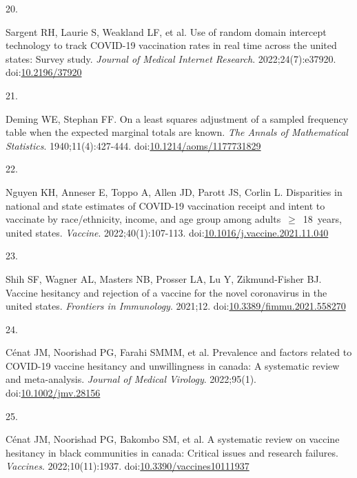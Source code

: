 \documentclass[
  letterpaper,
  DIV=11,
  numbers=noendperiod]{scrartcl}
\newlength{\cslhangindent}
\newlength{\csllabelwidth}
\newlength{\cslentryspacingunit} %
\newenvironment{CSLReferences}[2] %
 {%
  \setlength{\parindent}{0pt}
  \ifodd #1
  \let\oldpar\par
  \def\par{\hangindent=\cslhangindent\oldpar}
  \fi
  \setlength{\parskip}{#2\cslentryspacingunit}
 }%
 {}
\newcommand{\CSLLeftMargin}[1]{\parbox[t]{\csllabelwidth}{#1}}
\newcommand{\CSLRightInline}[1]{\parbox[t]{\linewidth - \csllabelwidth}{#1}\break}
\begin{document}
\begin{CSLReferences}{0}{0}
\leavevmode{}%
\CSLLeftMargin{20. }%
\CSLRightInline{Sargent RH, Laurie S, Weakland LF, et al. Use of random
domain intercept technology to track {COVID}-19 vaccination rates in
real time across the united states: Survey study. \emph{Journal of
Medical Internet Research}. 2022;24(7):e37920.
doi:\href{https://doi.org/10.2196/37920}{10.2196/37920}}

\leavevmode{}%
\CSLLeftMargin{21. }%
\CSLRightInline{Deming WE, Stephan FF. On a least squares adjustment of
a sampled frequency table when the expected marginal totals are known.
\emph{The Annals of Mathematical Statistics}. 1940;11(4):427-444.
doi:\href{https://doi.org/10.1214/aoms/1177731829}{10.1214/aoms/1177731829}}

\leavevmode{}%
\CSLLeftMargin{22. }%
\CSLRightInline{Nguyen KH, Anneser E, Toppo A, Allen JD, Parott JS,
Corlin L. Disparities in national and state estimates of {COVID}-19
vaccination receipt and intent to vaccinate by race/ethnicity, income,
and age group among adults~\(\geq\)~18~years, united states.
\emph{Vaccine}. 2022;40(1):107-113.
doi:\href{https://doi.org/10.1016/j.vaccine.2021.11.040}{10.1016/j.vaccine.2021.11.040}}

\leavevmode{}%
\CSLLeftMargin{23. }%
\CSLRightInline{Shih SF, Wagner AL, Masters NB, Prosser LA, Lu Y,
Zikmund-Fisher BJ. Vaccine hesitancy and rejection of a vaccine for the
novel coronavirus in the united states. \emph{Frontiers in Immunology}.
2021;12.
doi:\href{https://doi.org/10.3389/fimmu.2021.558270}{10.3389/fimmu.2021.558270}}

\leavevmode{}%
\CSLLeftMargin{24. }%
\CSLRightInline{Cénat JM, Noorishad PG, Farahi SMMM, et al. Prevalence
and factors related to {COVID}-19 vaccine hesitancy and unwillingness in
canada: A systematic review and meta-analysis. \emph{Journal of Medical
Virology}. 2022;95(1).
doi:\href{https://doi.org/10.1002/jmv.28156}{10.1002/jmv.28156}}

\leavevmode{}%
\CSLLeftMargin{25. }%
\CSLRightInline{Cénat JM, Noorishad PG, Bakombo SM, et al. A systematic
review on vaccine hesitancy in black communities in canada: Critical
issues and research failures. \emph{Vaccines}. 2022;10(11):1937.
doi:\href{https://doi.org/10.3390/vaccines10111937}{10.3390/vaccines10111937}}

\end{CSLReferences}
\end{document}
